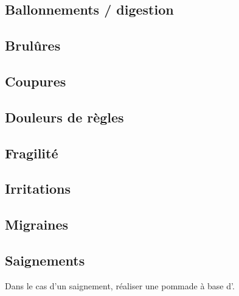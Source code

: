 

\subsection{Ballonnements / digestion}
    

\subsection{Brulûres}
    


\subsection{Coupures}
    

\subsection{Douleurs de règles}

\subsection{Fragilité}
    

\subsection{Irritations}
    

    

\subsection{Migraines}


\subsection{Saignements}

Dans le cas d'un saignement, réaliser une pommade à base d'. \\
